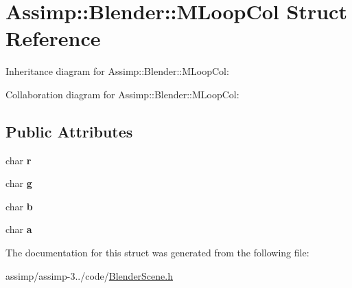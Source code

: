 \hypertarget{struct_assimp_1_1_blender_1_1_m_loop_col}{\section{Assimp\+:\+:Blender\+:\+:M\+Loop\+Col Struct Reference}
\label{struct_assimp_1_1_blender_1_1_m_loop_col}
}


Inheritance diagram for Assimp\+:\+:Blender\+:\+:M\+Loop\+Col\+:


Collaboration diagram for Assimp\+:\+:Blender\+:\+:M\+Loop\+Col\+:
\subsection*{Public Attributes}
\begin{DoxyCompactItemize}
\item 
\hypertarget{struct_assimp_1_1_blender_1_1_m_loop_col_a2bd1ae4c7372906c624bebb6462f1df7}{char {\bfseries r}}\label{struct_assimp_1_1_blender_1_1_m_loop_col_a2bd1ae4c7372906c624bebb6462f1df7}

\item 
\hypertarget{struct_assimp_1_1_blender_1_1_m_loop_col_af453c2c8fb188220da2a44b763fa13d8}{char {\bfseries g}}\label{struct_assimp_1_1_blender_1_1_m_loop_col_af453c2c8fb188220da2a44b763fa13d8}

\item 
\hypertarget{struct_assimp_1_1_blender_1_1_m_loop_col_a1bf6184b7b97dafaedce4c107864c8c9}{char {\bfseries b}}\label{struct_assimp_1_1_blender_1_1_m_loop_col_a1bf6184b7b97dafaedce4c107864c8c9}

\item 
\hypertarget{struct_assimp_1_1_blender_1_1_m_loop_col_a362af385d88f7b25ddb8f8ceffb64251}{char {\bfseries a}}\label{struct_assimp_1_1_blender_1_1_m_loop_col_a362af385d88f7b25ddb8f8ceffb64251}

\end{DoxyCompactItemize}


The documentation for this struct was generated from the following file\+:\begin{DoxyCompactItemize}
\item 
assimp/assimp-\/3../code/\hyperlink{_blender_scene_8h}{Blender\+Scene.\+h}\end{DoxyCompactItemize}
